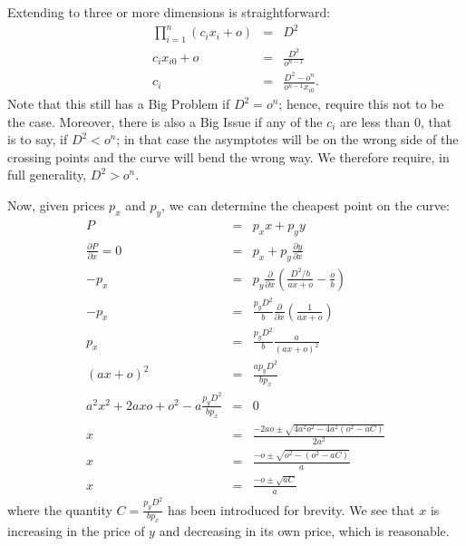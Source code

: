 \documentclass[12pt]{book}
\begin{document}
Extending to three or more dimensions is straightforward:
\begin{eqnarray*}
\prod_{i=1}^{n}(c_ix_i + o) &=& D^2\\
c_ix_{i0} + o &=& \frac{D^2}{o^{n-1}}\\
c_i &=& \frac{D^2-o^n}{o^{n-1}x_{i0}}.
\end{eqnarray*}
Note that this still has a Big Problem if $D^2=o^n$; hence, require this
not to be the case. Moreover, there is also a Big Issue if any of the
$c_i$ are less than 0, that is to say, if $D^2<o^n$; in that case the
asymptotes will be on the wrong side of the crossing points and the
curve will bend the wrong way. We therefore require, in full
generality, $D^2>o^n$.

Now, given prices $p_x$ and $p_y$, we can determine the cheapest point
on the curve:
\begin{eqnarray*}
P &=& p_xx + p_yy\\
\frac{\partial P}{\partial x} = 0 &=& p_x + p_y\frac{\partial y}{\partial x}\\
-p_x &=& p_y\frac{\partial }{\partial x}\left(\frac{D^2/b}{ax+o}-\frac{o}{b}\right)\\
-p_x &=& \frac{p_yD^2}{b}\frac{\partial }{\partial x}\left(\frac{1}{ax+o}\right)\\
p_x &=& \frac{p_yD^2}{b}\frac{a}{(ax+o)^2}\\
(ax+o)^2 &=& \frac{ap_yD^2}{bp_x}\\
a^2x^2 + 2axo + o^2 - a\frac{p_yD^2}{bp_x} &=& 0 \\
x &=& \frac{-2ao\pm\sqrt{4a^2o^2 - 4a^2(o^2 - aC)}}{2a^2} \\
x &=& \frac{-o\pm\sqrt{o^2 - (o^2 - aC)}}{a} \\
x &=& \frac{-o\pm\sqrt{aC}}{a}
\end{eqnarray*}
where the quantity $C = \frac{p_yD^2}{bp_x}$ has been
introduced for brevity. We see that $x$ is increasing in the price of
$y$ and decreasing in its own price, which is reasonable.
\end{document}
